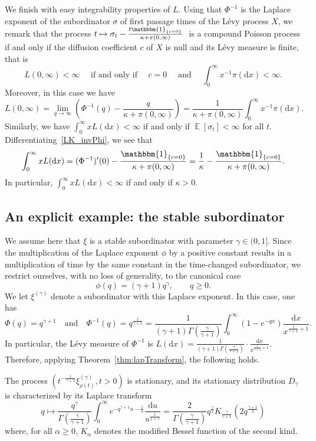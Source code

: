 \documentclass[AHL,Unicode,longabstracts,published]{cedram}
\DeclareMathOperator{\E}{\mathbb{E}}
\newcommand{\dd}{\mathrm{d}}
\newcommand{\ind}[1]{\mathbbm{1}_{\left\{#1\right\}}}
\begin{document}
We finish with easy integrability properties of $L$. Using that $\Phi^{-1}$ is the Laplace exponent of the subordinator $\sigma$ of first passage times of the Lévy process $X$, we remark that the process $t \mapsto \sigma_t - \frac{t \ind{c = 0}}{\kappa + \pi(0,\infty)}~$ is a compound Poisson process if and only if the diffusion coefficient $c$ of $X$ is null and its Lévy measure is finite, that is
\[
L(0,\infty) < \infty \quad \text{ if and only if } \quad c = 0 \quad \text{ and } \quad \int_0^\infty x^{-1} \pi(\dd  x) <\infty.
\]
Moreover, in this case we have
\[
L(0,\infty) = \lim_{q \to \infty} \left(\Phi^{-1}(q) - \frac{q}{\kappa + \pi(0,\infty)}\right) = \frac{1}{\kappa + \pi(0,\infty)} \int_0^\infty x^{-1} \pi(\dd x).
\]
Similarly, we have $\int_0^{\infty} x L(\dd x) < \infty$ if and only if $\E[\sigma_t] < \infty$ for all $t$. Differentiating~\eqref{LK_invPhi}, we see that
\[
\int_0^{\infty} x L(\dd x) = (\Phi^{-1})'(0) - \frac{\ind{c = 0}}{\kappa + \pi(0,\infty)} = \frac{1}{\kappa} - \frac{\ind{c = 0}}{\kappa + \pi(0,\infty)}.
\]
In particular, $\int_0^{\infty} x L(\dd x) < \infty$ if and only if $\kappa > 0$.


\subsection{An explicit example: the stable subordinator}\label{sec:stable}

We assume here that $\xi$ is a stable subordinator with parameter $\gamma \in (0,1]$. Since the multiplication of the Laplace exponent $\phi$ by a positive constant results in a multiplication of time by the same constant in the time-changed subordinator, we restrict ourselves, with no loss of generality, to the canonical case
\[
\phi(q)=(\gamma+1)q^{\gamma}, \qquad q \geq 0.
\]
We let $\xi^{(\gamma)}$ denote a subordinator with this Laplace exponent. In this case, one has
\[
\Phi(q) = q^{\gamma +1} \quad \text{and} \quad \Phi^{-1}(q) = q^\frac{1}{\gamma + 1} = \frac{1}{(\gamma+1)\Gamma\left(\frac{\gamma}{\gamma+1}\right)}\int_0^\infty \left(1 - e^{-q x}\right) \frac{\dd x }{x^{\frac{1}{\gamma +1}+1}}.
\]
In particular, the Lévy measure of $\Phi^{-1}$ is $L(\dd x) = \frac{1}{(\gamma+1)\Gamma(\frac{\gamma}{\gamma+1})} \cdot \frac{\dd x }{x^{\frac{1}{\gamma +1}+1}}$. Therefore, applying Theorem~\ref{thm:lapTransform}, the following holds.

\begin{coro}\label{cor:stable}
The process $(t^{-\frac{1}{\gamma+1}}\xi^{(\gamma)}_{\rho(t)}, t >0)$ is stationary, and its stationary distribution $D_{\gamma}$ is characterized by its Laplace transform
\[
q \mapsto \frac{q^{\gamma}}{\Gamma\left(\frac{\gamma}{\gamma+1} \right)} \int_0^{\infty} e^{-q^{\gamma+1}u-\frac{1}{u}} \frac{ \dd u}{u^{\frac{1}{1+\gamma}}} = \frac{2}{\Gamma\left(\frac{\gamma}{\gamma+1} \right)} q^{\frac{\gamma}{2}}K_{\frac{\gamma}{\gamma+1}}\left(2q^{\frac{\gamma+1}{2}}\right)
\]
where, for all $\alpha \geq 0$, $K_{\alpha}$ denotes the modified Bessel function of the second kind.
\end{coro}
\end{document}
